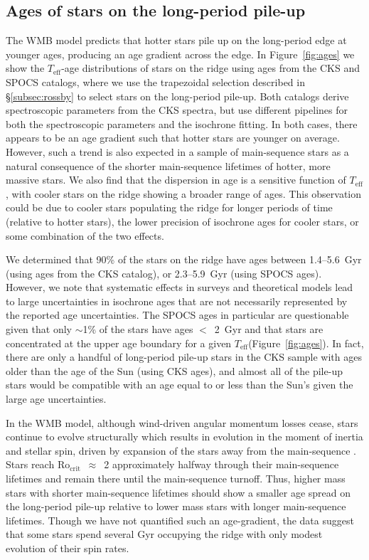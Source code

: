 \documentclass[linenumbers,trackchanges,twocolumn]{aastex631}
\newcommand{\rocrit}{$\mathrm{Ro_{crit}}$\xspace}
\newcommand{\teff}{\ensuremath{T_{\mathrm{eff}}}\xspace}
\begin{document}
\subsection{Ages of stars on the long-period pile-up}
\label{subsec:ages}
The WMB model predicts that hotter stars pile up on the long-period edge at younger ages, producing an age gradient across the edge. In Figure~\ref{fig:ages} we show the \teff-age distributions of stars on the ridge using ages from the CKS and SPOCS \citep{Brewer2018} catalogs, where we use the trapezoidal selection described in \S\ref{subsec:rossby} to select stars on the long-period pile-up. Both catalogs derive spectroscopic parameters from the CKS spectra, but use different pipelines for both the spectroscopic parameters and the isochrone fitting. In both cases, there appears to be an age gradient such that hotter stars are younger on average. However, such a trend is also expected in a sample of main-sequence stars as a natural consequence of the shorter main-sequence lifetimes of hotter, more massive stars. We also find that the dispersion in age is a sensitive function of \teff, with cooler stars on the ridge showing a broader range of ages. This observation could be due to cooler stars populating the ridge for longer periods of time (relative to hotter stars), the lower precision of isochrone ages for cooler stars, or some combination of the two effects.

We determined that 90\% of the stars on the ridge have ages between 1.4--5.6~Gyr (using ages from the CKS catalog), or 2.3--5.9~Gyr (using SPOCS ages). However, we note that systematic effects in surveys and theoretical models lead to large uncertainties in isochrone ages that are not necessarily represented by the reported age uncertainties. The SPOCS ages in particular are questionable given that only $\sim$1\% of the stars have ages $<$~2~Gyr and that stars are concentrated at the upper age boundary for a given \teff (Figure~\ref{fig:ages}). In fact, there are only a handful of long-period pile-up stars in the CKS sample with ages older than the age of the Sun (using CKS ages), and almost all of the pile-up stars would be compatible with an age equal to or less than the Sun's given the large age uncertainties. 

In the WMB model, although wind-driven angular momentum losses cease, stars continue to evolve structurally which results in evolution in the moment of inertia and stellar spin, driven by expansion of the stars away from the main-sequence \citep{vanSaders2019}. Stars reach \rocrit~$\approx$~2 approximately halfway through their main-sequence lifetimes and remain there until the main-sequence turnoff. Thus, higher mass stars with shorter main-sequence lifetimes should show a smaller age spread on the long-period pile-up relative to lower mass stars with longer main-sequence lifetimes. Though we have not quantified such an age-gradient, the data suggest that some stars spend several Gyr occupying the ridge with only modest evolution of their spin rates.
\end{document}
